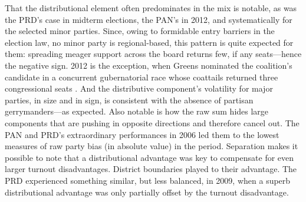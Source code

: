 \documentclass[letter,12pt]{article}
\begin{document}
That the distributional element often predominates in the mix is notable, as was the PRD's case in midterm elections, the PAN's in 2012, and systematically for the selected minor parties. Since, owing to formidable entry barriers in the election law, no minor party is regional-based, this pattern is quite expected for them: spreading meager support across the board returns few, if any seats---hence the negative sign. 2012 is the exception, when Greens nominated the coalition's candidate in a concurrent gubernatorial race whose coattails returned three congressional seats \citep{magar.gubCoatMx.2012}. And the distributive component's volatility for major parties, in size and in sign, is consistent with the absence of partisan gerrymanders---as expected. Also notable is how the raw sum hides large components that are pushing in opposite directions and therefore cancel out. The PAN and PRD's extraordinary performances in 2006 led them to the lowest measures of raw party bias (in absolute value) in the period. Separation makes it possible to note that a distributional advantage was key to compensate for even larger turnout disadvantages. District boundaries played to their advantage. The PRD experienced something similar, but less balanced, in 2009, when a superb distributional advantage was only partially offset by the turnout disadvantage. 
\end{document}
